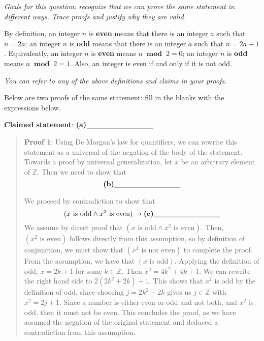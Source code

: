 
{\it Goals for this question: recognize that we can prove the same statement
in different ways.  Trace proofs and justify why they are valid.}


 By definition, an integer $n$ is {\bf even} means that there is an integer $a$ such that $n = 2a$; 
an integer $n$ is {\bf odd} means that there is an integer $a$ such that $n = 2a+1$.  Equivalently, 
an integer $n$ is {\bf even} means $n ~\textbf{ mod }~2 = 0$; an integer $n$ is {\bf odd} means $n ~\textbf{ mod }~2 = 1$.  Also, an integer is even if and only if it is not odd.

{\it You can refer to any of the above definitions and claims in your proofs.}

Below are two proofs of the same statement: fill in the blanks with the 
expressions below.

{\bf Claimed statement}:  \textbf{(a)}$\underline{\phantom{\hspace{1.3in}}}$
\begin{quote}

{\bf Proof 1}: Using De Morgan's law for quantifiers, 
we can rewrite this statement as a universal of the negation of the body of the statement.
Towards a proof by universal generalization, let $x$ be an arbitrary element of $\mathbb{Z}$. Then we need to show that
$$\textbf{(b)}\underline{\phantom{\hspace{1.3in}}}$$

We proceed by contradiction to show that $$(x \textrm{ is odd} \land x^2 \textrm{ is even}) \to \textbf{(c)}\underline{\phantom{\hspace{1.3in}}}$$
We assume by direct proof that $(x \textrm{ is odd} \land x^2 \textrm{ is even})$. Then, $(x^2 \textrm{ is even})$ follows directly from this assumption, so by definition 
of conjunction, we must show that $(x^2 \textrm{ is not even})$ to complete the proof.
From the assumption, we have that $(x \textrm{ is odd})$.  Applying the definition of odd, $x = 2k + 1$ for some $k \in \mathbb{Z}$. Then $x^2 = 4k^2 + 4k + 1$. We can rewrite the right hand side to $2(2k^2 + 2k) + 1$. This shows that $x^2$ is odd by the definition of odd, since choosing $j = 2k^2 + 2k$ gives us $j \in \mathbb{Z}$ with $x^2 = 2j + 1$. Since a number is either even or odd and not both, and $x^2$ is odd, then it must not be even. 
This concludes the proof, as we have assumed the negation of the original statement and deduced a contradiction
from this assumption.
\end{quote}

